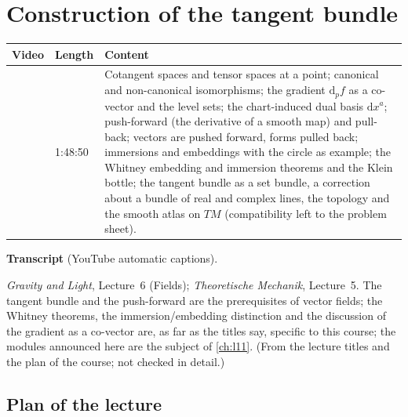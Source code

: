 \chapter{Construction of the tangent bundle}\label{ch:l10}
\begin{paracol}{2}

\begin{sources}
\begin{tabularx}{\linewidth}{@{}l l L@{}}
\toprule
\textbf{Video} & \textbf{Length} & \textbf{Content}\\
\midrule
{} & 1:48:50 & Cotangent spaces and tensor spaces at a point; canonical and non-canonical isomorphisms; the gradient $\mathrm d_pf$ as a co-vector and the level sets; the chart-induced dual basis $\mathrm dx^a$;
push-forward (the derivative of a smooth map) and pull-back; vectors are pushed forward, forms pulled back; immersions and embeddings with the circle as example; the Whitney embedding and immersion theorems and the Klein bottle;
the tangent bundle as a set bundle, a correction about a bundle of real and complex lines, the topology and the smooth atlas on $TM$ (compatibility left to the problem sheet).\\
\bottomrule
\end{tabularx}

\smallskip
\textbf{Transcript}  (YouTube automatic captions).
\end{sources}

\begin{reading}
\emph{Gravity and Light}, Lecture~6 (Fields); \emph{Theoretische Mechanik}, Lecture~5. The tangent bundle and the push-forward are the prerequisites of vector fields; the Whitney theorems, the immersion/embedding distinction and the discussion of the gradient
as a co-vector are, as far as the titles say, specific to this course; the modules announced here are the subject of \cref{ch:l11}.
(From the lecture titles and the plan of the course; not checked in detail.)
\end{reading}

\section{Plan of the lecture}\label{sec:tb-plan}


\end{paracol}
